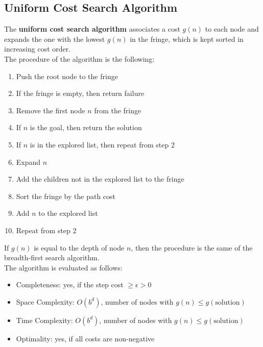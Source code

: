 \documentclass{article}
\begin{document}
\subsection{Uniform Cost Search Algorithm}
The \textbf{uniform cost search algorithm} associates a cost $g(n)$ to each node and expands the one with the lowest $g(n)$ in the fringe, which is kept sorted in increasing cost order. \\
The procedure of the algorithm is the following:
\begin{enumerate}
    \item Push the root node to the fringe
    \item If the fringe is empty, then return failure
    \item Remove the first node $n$ from the fringe
    \item If $n$ is the goal, then return the solution
    \item If $n$ is in the explored list, then repeat from step 2
    \item Expand $n$
    \item Add the children not in the explored list to the fringe
    \item Sort the fringe by the path cost
    \item Add $n$ to the explored list
    \item Repeat from step 2
\end{enumerate}
If $g(n)$ is equal to the depth of node $n$, then the procedure is the same of the breadth-first search algorithm. \\
The algorithm is evaluated as follows:
\begin{itemize}
    \item Completeness: yes, if the step cost $\geq \epsilon > 0$
    \item Space Complexity: $O(b^d)$, number of nodes with $g(n) \leq g(\text{solution})$
    \item Time Complexity: $O(b^d)$, number of nodes with $g(n) \leq g(\text{solution})$
    \item Optimality: yes, if all costs are non-negative
\end{itemize}
\newpage
\end{document}

